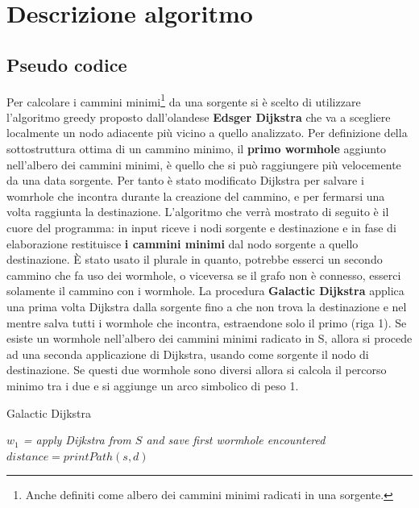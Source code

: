 \def\baselinestretch{1}
\section{Descrizione algoritmo}
\def\baselinestretch{1.66}
\thispagestyle{headings}

\subsection{Pseudo codice}\label{gg}
\indent Per calcolare i cammini minimi\footnote{Anche definiti
come albero dei cammini minimi radicati in una sorgente.} da una sorgente si \`e
scelto di utilizzare l'algoritmo greedy proposto dall'olandese \textbf{Edsger 
Dijkstra} che va a scegliere localmente 
un nodo adiacente pi\`u vicino a quello analizzato. Per
definizione della sottostruttura ottima di un cammino minimo, il
\textbf{primo wormhole} aggiunto nell'albero dei cammini minimi, \`e
quello che si pu\`o raggiungere pi\`u velocemente da una data
sorgente. Per tanto \`e stato modificato Dijkstra per salvare i womrhole che
incontra durante la creazione del cammino, e per fermarsi una volta raggiunta la destinazione.\newline
\indent L'algoritmo che verr\`a mostrato di seguito \`e il cuore
del programma: in input riceve i nodi sorgente e destinazione
e in fase di elaborazione restituisce \textbf{i cammini minimi}
dal nodo sorgente a quello destinazione. \`E stato usato
il plurale in quanto, potrebbe esserci un secondo cammino
che fa uso dei wormhole, o viceversa se il grafo non
\`e connesso, esserci solamente il cammino con i wormhole.\newline
\indent La procedura \textbf{Galactic Dijkstra} applica una prima volta 
Dijkstra dalla sorgente fino a che non trova la
destinazione e nel mentre salva tutti i wormhole che incontra,
estraendone solo il primo (riga 1).
Se esiste un wormhole nell'albero dei cammini minimi radicato in S,
allora si procede ad una seconda applicazione di Dijkstra, usando
come sorgente il nodo di destinazione. Se questi due wormhole
sono diversi allora si calcola il percorso minimo tra i due e si
aggiunge un arco simbolico di peso 1.\newline


\IncMargin{1.5em}
\begin{algorithm}[H]
\caption{Galactic Dijkstra}
\BlankLine\BlankLine
{}
\BlankLine
\emph{$w_1$ = apply Dijkstra from $S$ and save first wormhole encountered}\;
$distance = printPath(s, d)$\;
\BlankLine
\end{algorithm}
\DecMargin{1em}

